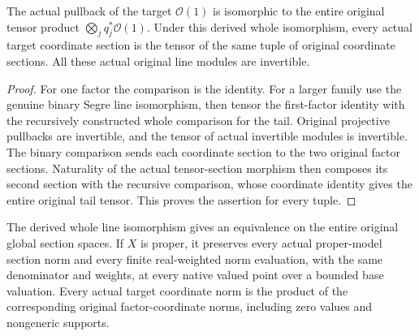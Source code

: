 \begin{theorem}
\label{thm:finite-original-segre-whole-line}
\leanok
{}
The actual pullback of the target $\mathcal O(1)$ is isomorphic to the
entire original tensor product $\bigotimes_jq_j^*\mathcal O(1)$.
Under this derived whole isomorphism, every actual target coordinate
section is the tensor of the same tuple of original coordinate sections.
All these actual original line modules are invertible.
\end{theorem}
\begin{proof}
For one factor the comparison is the identity. For a larger family use
the genuine binary Segre line isomorphism, then tensor the first-factor
identity with the recursively constructed whole comparison for the tail.
Original projective pullbacks are invertible, and the tensor of actual
invertible modules is invertible. The binary comparison sends each
coordinate section to the two original factor sections. Naturality of
the actual tensor-section morphism then composes its second section
with the recursive comparison, whose coordinate identity gives the
entire original tail tensor. This proves the assertion for every tuple.
\end{proof}
\begin{theorem}
\label{thm:finite-original-segre-whole-section-isometry}
\leanok
{}
The derived whole line isomorphism gives an equivalence on the entire
original global section spaces. If $X$ is proper, it preserves every
actual proper-model section norm and every finite real-weighted norm
evaluation, with the same denominator and weights, at every native valued
point over a bounded base valuation. Every actual target coordinate norm
is the product of the corresponding original factor-coordinate norms,
including zero values and nongeneric supports.
\end{theorem}

